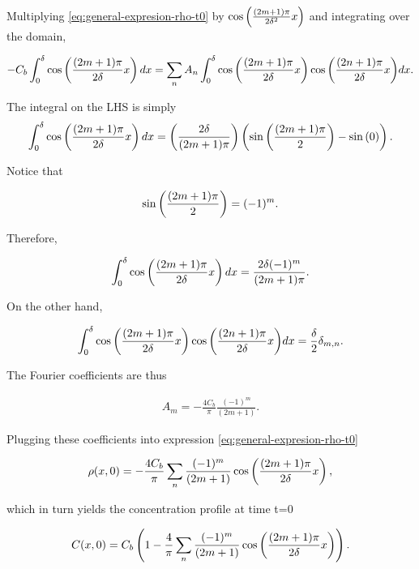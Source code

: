 Multiplying \ref{eq:general-expresion-rho-t0} by $\cos\left({\frac{(2m+1)\pi}{2\delta^2} x}\right)$ and integrating over the domain, 



\begin{align}
	-C_b\int_0^\delta \cos\left({\frac{(2m+1)\pi}{2\delta} x}\right) dx  = \sum_{n}A_n\int_0^\delta {\cos \left({\frac{(2m+1)\pi}{2\delta} x}\right) \cos \left({\frac{(2n+1)\pi}{2\delta}x}\right)  } dx.
	\label{eq:using-cos-orthogonality}
\end{align}


The integral on the LHS is simply
\begin{align}
	\int_0^\delta \cos\left({\frac{(2m+1)\pi}{2\delta} x}\right) dx = \left({\frac{2\delta}{(2m+1)\pi}}\right)\left({\sin\left({\frac{(2m+1)\pi}{2}}\right)-\sin\left({0}\right)}\right).
	\label{eq:cos-integral}
\end{align}

Notice that

\begin{align}
	\sin\left({\frac{(2m+1)\pi}{2}}\right) = (-1)^m.
\end{align}


Therefore,

\begin{align}
	\int_0^\delta \cos\left({\frac{(2m+1)\pi}{2\delta} x}\right) dx = \frac{2\delta(-1)^m}{(2m+1)\pi}.
\end{align}

On the other hand, 

\begin{align}
	\int_0^\delta {\cos \left({\frac{(2m+1)\pi}{2\delta} x}\right) \cos \left({\frac{(2n+1)\pi}{2\delta}x}\right)  } dx = \frac{\delta}{2}\delta_{m,n}.
\end{align}

The Fourier coefficients are thus

\begin{align}
	A_m = -\frac{4C_b}{\pi}\frac{(-1)^m}{(2m+1)}.
\end{align}


Plugging these coefficients into expression \ref{eq:general-expresion-rho-t0}

\begin{align}
	\rho(x,0) = -\frac{4C_b}{\pi} \sum_n \frac{(-1)^m}{(2m+1)}\cos\left({\frac{(2m+1)\pi}{2\delta} x}\right),
\end{align}

which in turn yields the concentration profile at time t=0

\begin{align}
	C(x,0) = C_b\left({1-\frac{4}{\pi} \sum_n \frac{(-1)^m}{(2m+1)}\cos\left({\frac{(2m+1)\pi}{2\delta} x}\right)}\right).
\end{align}


